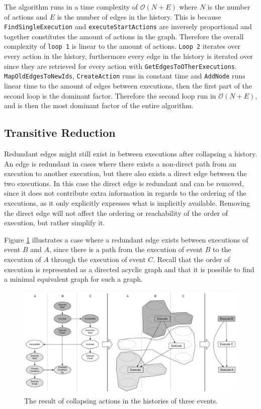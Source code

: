 	\newpar The algorithm runs in a time complexity of $\mathcal{O}(N+E)$ where $N$ is the number of actions and $E$ is the number of edges in the history. This is because \texttt{FindSingleExecution} and \texttt{executeStartActions} are inversely proportional and together constitutes the amount of actions in the graph. Therefore the overall complexity of \texttt{loop 1} is linear to the amount of actions. \texttt{Loop 2} iterates over every action in the history, furthermore every edge in the history is iterated over since they are retrieved for every action with \texttt{GetEdgesToOTherExecutions}. \texttt{MapOldEdgesToNewIds}, \texttt{CreateAction} runs in constant time and \texttt{AddNode} runs linear time to the amount of edges between executions, then the first part of the second loop is the dominant factor. Therefore the second loop run in $\mathcal{O}(N+E)$, and is then the most dominant factor of the entire algorithm.
	
	\subsection{Transitive Reduction}
	Redundant edges might still exist in between executions after collapsing a history. An edge is redundant in cases where there exists a non-direct path from an execution to another execution, but there also exists a direct edge between the two executions. In this case the direct edge is redundant and can be removed, since it does not contribute extra information in regards to the ordering of the executions, as it only explicitly expresses what is implicitly available. Removing the direct edge will not affect the ordering or reachability of the order of execution, but rather simplify it.
	
	\newpar Figure \ref{fig:orderofexecution:collapsing} illustrates a case where a redundant edge exists between executions of event $B$ and $A$, since there is a path from the execution of event $B$ to the execution of $A$ through the execution of event $C$. Recall that the order of execution is represented as a directed acyclic graph and that it is possible to find a minimal equivalent graph for such a graph.
	
	\begin{figure}[H]
		\centering
		\includegraphics[width=\textwidth]{5orderofexecution/images/transitive-example-collapse.pdf}
		\caption{The result of collapsing actions in the histories of three events.}
		\label{fig:orderofexecution:collapsing}
	\end{figure}
	

